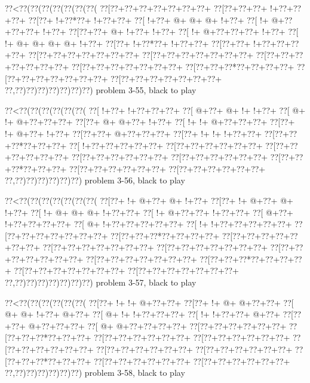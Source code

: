 \vbox{\vbox{\goo
\0??<\0??(\0??(\0??(\0??(\0??(\0??(\0??(
\0??[\0??+\0??+\0??+\0??+\0??+\0??+\0??+
\0??[\0??+\0??+\0??+\- !+\0??+\0??+\0??+
\0??[\0??+\- !+\0??*\0??+\- !+\0??+\0??+
\0??[\- !+\0??+\- @+\- @+\- @+\- !+\0??+
\0??[\- !+\- @+\0??+\0??+\0??+\- !+\0??+
\0??[\0??+\0??+\- @+\- !+\0??+\- !+\0??+
\0??[\- !+\- @+\0??+\0??+\0??+\- !+\0??+
\0??[\- !+\- @+\- @+\- @+\- @+\- !+\0??+
\0??[\0??+\- !+\0??*\0??+\- !+\0??+\0??+
\0??[\0??+\0??+\- !+\0??+\0??+\0??+\0??+
\0??[\0??+\0??+\0??+\0??+\0??+\0??+\0??+
\0??[\0??+\0??+\0??+\0??+\0??+\0??+\0??+
\0??[\0??+\0??+\0??+\0??+\0??+\0??+\0??+
\0??[\0??+\0??+\0??+\0??+\0??+\0??+\0??+
\0??[\0??+\0??+\0??*\0??+\0??+\0??+\0??+
\0??[\0??+\0??+\0??+\0??+\0??+\0??+\0??+
\0??[\0??+\0??+\0??+\0??+\0??+\0??+\0??+
\0??,\0??)\0??)\0??)\0??)\0??)\0??)\0??)
}
\hfil problem 3-55, black to play\hfil\break
}

\vbox{\vbox{\goo
\0??<\0??(\0??(\0??(\0??(\0??(\0??(
\0??[\- !+\0??+\- !+\0??+\0??+\0??+
\0??[\- @+\0??+\- @+\- !+\- !+\0??+
\0??[\- @+\- !+\- @+\0??+\0??+\0??+
\0??[\0??+\- @+\- @+\0??+\- !+\0??+
\0??[\- !+\- !+\- @+\0??+\0??+\0??+
\0??[\0??+\- !+\- @+\0??+\- !+\0??+
\0??[\0??+\0??+\- @+\0??+\0??+\0??+
\0??[\0??+\- !+\- !+\- !+\0??+\0??+
\0??[\0??+\0??+\0??*\0??+\0??+\0??+
\0??[\- !+\0??+\0??+\0??+\0??+\0??+
\0??[\0??+\0??+\0??+\0??+\0??+\0??+
\0??[\0??+\0??+\0??+\0??+\0??+\0??+
\0??[\0??+\0??+\0??+\0??+\0??+\0??+
\0??[\0??+\0??+\0??+\0??+\0??+\0??+
\0??[\0??+\0??+\0??*\0??+\0??+\0??+
\0??[\0??+\0??+\0??+\0??+\0??+\0??+
\0??[\0??+\0??+\0??+\0??+\0??+\0??+
\0??,\0??)\0??)\0??)\0??)\0??)\0??)
}
\hfil problem 3-56, black to play\hfil\break
}

\vbox{\vbox{\goo
\0??<\0??(\0??(\0??(\0??(\0??(\0??(\0??(
\0??[\0??+\- !+\- @+\0??+\- @+\- !+\0??+
\0??[\0??+\- !+\- @+\0??+\- @+\- !+\0??+
\0??[\- !+\- @+\- @+\- @+\- !+\0??+\0??+
\0??[\- !+\- @+\0??+\0??+\- !+\0??+\0??+
\0??[\- @+\0??+\- !+\0??+\0??+\0??+\0??+
\0??[\- @+\- !+\0??+\0??+\0??+\0??+\0??+
\0??[\- !+\- !+\0??+\0??+\0??+\0??+\0??+
\0??[\0??+\0??+\0??+\0??+\0??+\0??+\0??+
\0??[\0??+\0??+\0??*\0??+\0??+\0??+\0??+
\0??[\0??+\0??+\0??+\0??+\0??+\0??+\0??+
\0??[\0??+\0??+\0??+\0??+\0??+\0??+\0??+
\0??[\0??+\0??+\0??+\0??+\0??+\0??+\0??+
\0??[\0??+\0??+\0??+\0??+\0??+\0??+\0??+
\0??[\0??+\0??+\0??+\0??+\0??+\0??+\0??+
\0??[\0??+\0??+\0??*\0??+\0??+\0??+\0??+
\0??[\0??+\0??+\0??+\0??+\0??+\0??+\0??+
\0??[\0??+\0??+\0??+\0??+\0??+\0??+\0??+
\0??,\0??)\0??)\0??)\0??)\0??)\0??)\0??)
}
\hfil problem 3-57, black to play\hfil\break
}

\vbox{\vbox{\goo
\0??<\0??(\0??(\0??(\0??(\0??(\0??(
\0??[\0??+\- !+\- !+\- @+\0??+\0??+
\0??[\0??+\- !+\- @+\- @+\0??+\0??+
\0??[\- @+\- @+\- !+\0??+\- @+\0??+
\0??[\- @+\- !+\- !+\0??+\0??+\0??+
\0??[\- !+\- !+\0??+\0??+\- @+\0??+
\0??[\0??+\0??+\- @+\0??+\0??+\0??+
\0??[\- @+\- @+\0??+\0??+\0??+\0??+
\0??[\0??+\0??+\0??+\0??+\0??+\0??+
\0??[\0??+\0??+\0??*\0??+\0??+\0??+
\0??[\0??+\0??+\0??+\0??+\0??+\0??+
\0??[\0??+\0??+\0??+\0??+\0??+\0??+
\0??[\0??+\0??+\0??+\0??+\0??+\0??+
\0??[\0??+\0??+\0??+\0??+\0??+\0??+
\0??[\0??+\0??+\0??+\0??+\0??+\0??+
\0??[\0??+\0??+\0??*\0??+\0??+\0??+
\0??[\0??+\0??+\0??+\0??+\0??+\0??+
\0??[\0??+\0??+\0??+\0??+\0??+\0??+
\0??,\0??)\0??)\0??)\0??)\0??)\0??)
}
\hfil problem 3-58, black to play\hfil\break
}

